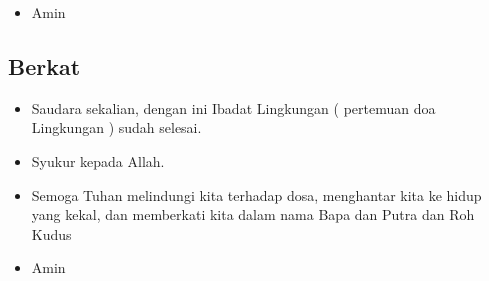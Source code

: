 \documentclass[a5paper,headsepline,titlepage,12pt,nnormalheadings,DIVcalc]{scrbook}
\newcommand{\BU}[1]{\begin{itemize} \item[U:] #1 \end{itemize}}
\newcommand{\BP}[1]{\begin{itemize} \item[P:] #1 \end{itemize}}
\begin{document}
\BU{Amin}

\subsection*{Berkat}
\BP{Saudara sekalian, dengan ini Ibadat Lingkungan ( pertemuan doa Lingkungan ) sudah selesai.}

\BU{Syukur kepada Allah.}

\BP{Semoga Tuhan melindungi kita terhadap dosa, menghantar kita ke hidup yang kekal, dan memberkati kita dalam nama Bapa dan Putra dan Roh Kudus}
\BU{Amin} 
\end{document}
